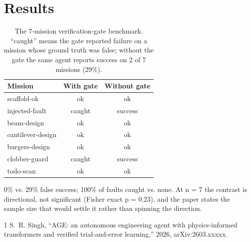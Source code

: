 \documentclass[conference,10pt]{IEEEtran}
\begin{document}
\section{Results}
\begin{table}[!t]
\caption{The 7-mission verification-gate benchmark. ``caught'' means the
gate reported failure on a mission whose ground truth was false; without
the gate the same agent reports success on 2 of 7 missions (29\%).}
\label{tab:gate}
\centering
\begin{tabular}{lcc}
\toprule
Mission & With gate & Without gate \\
\midrule
scaffold-ok & ok & ok \\
injected-fault & caught & success \\
beam-design & ok & ok \\
cantilever-design & ok & ok \\
burgers-design & ok & ok \\
clobber-guard & caught & success \\
todo-scan & ok & ok \\
\bottomrule
\end{tabular}
\end{table}

0\% vs. 29\% false success; 100\% of faults caught vs. none. At n = 7 the contrast is directional, not significant (Fisher exact p = 0.23), and the paper states the sample size that would settle it rather than spinning the direction.

\begin{thebibliography}{1}
 S.~R. Singh, ``AGE: an autonomous engineering agent with physics-informed transformers and verified trial-and-error learning,'' 2026, arXiv:2603.xxxxx.
\end{thebibliography}
\end{document}
